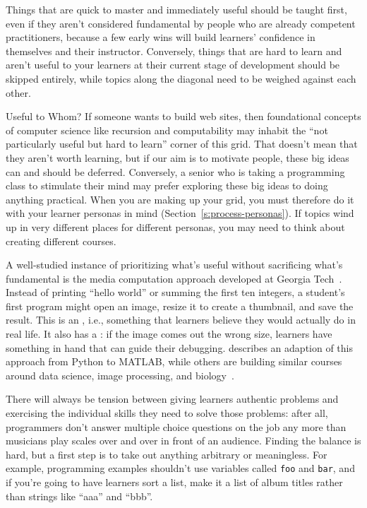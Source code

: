 
Things that are quick to master and immediately useful should be taught first,
even if they aren't considered fundamental by people who are already competent practitioners,
because a few early wins will build learners' confidence in themselves and their instructor.
Conversely,
things that are hard to learn and aren't useful to your learners at their current stage of development
should be skipped entirely,
while topics along the diagonal need to be weighed against each other.

\begin{aside}{Useful to Whom?}
  If someone wants to build web sites,
  then foundational concepts of computer science like recursion and computability
  may inhabit the ``not particularly useful but hard to learn'' corner of this grid.
  That doesn't mean that they aren't worth learning,
  but if our aim is to motivate people,
  these big ideas can and should be deferred.
  Conversely,
  a senior who is taking a programming class to stimulate their mind
  may prefer exploring these big ideas to doing anything practical.
  When you are making up your grid,
  you must therefore do it with your learner personas in mind
  (Section~\ref{s:process-personas}).
  If topics wind up in very different places for different personas,
  you may need to think about creating different courses.
\end{aside}

A well-studied instance of prioritizing what's useful
without sacrificing what's fundamental
is the media computation approach developed at Georgia Tech~\cite{Guzd2013}.
Instead of printing ``hello world'' or summing the first ten integers,
a student's first program might open an image,
resize it to create a thumbnail,
and save the result.
This is an ,
i.e.,
something that learners believe they would actually do in real life.
It also has a :
if the image comes out the wrong size,
learners have something in hand that can guide their debugging.
\cite{Lee2013} describes an adaption of this approach from Python to MATLAB,
while others are building similar courses around data science, image processing,
and biology~\cite{Dahl2018,Meys2018,Ritz2018}.

There will always be tension between giving learners authentic problems
and exercising the individual skills they need to solve those problems:
after all,
programmers don't answer multiple choice questions on the job
any more than musicians play scales over and over in front of an audience.
Finding the balance is hard,
but a first step is to take out anything arbitrary or meaningless.
For example,
programming examples shouldn't use variables called \texttt{foo} and \texttt{bar},
and if you're going to have learners sort a list,
make it a list of album titles rather than strings like ``aaa'' and ``bbb''.

